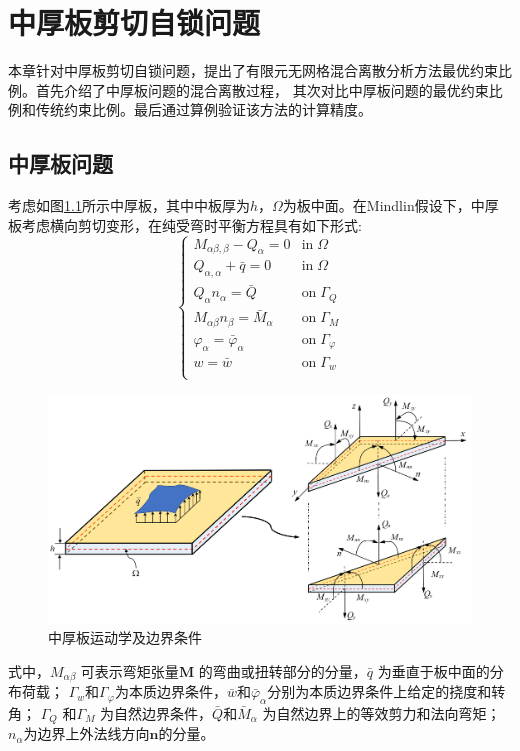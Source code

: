 \chapter{中厚板剪切自锁问题}
本章针对中厚板剪切自锁问题，提出了有限元无网格混合离散分析方法最优约束比例。首先介绍了中厚板问题的混合离散过程，
其次对比中厚板问题的最优约束比例和传统约束比例。最后通过算例验证该方法的计算精度。
\section{中厚板问题}                  
考虑如图\ref{Mindlinplate}所示中厚板，其中中板厚为$h$，$\Omega$为板中面。在Mindlin假设下，中厚板考虑横向剪切变形，在纯受弯时平衡方程具有如下形式:
\begin{equation}\label{z-1}
\begin{cases}
    M_{\alpha\beta,\beta} - Q_\alpha = 0 & \textrm{in}\; \Omega \\
    Q_{\alpha,\alpha} + \bar q = 0 & \textrm{in}\; \Omega \\    Q_\alpha n_\alpha = \bar Q & \textrm{on}\; \Gamma_Q \\
    M_{\alpha\beta} n_\beta = \bar M_\alpha & \textrm{on}\; \Gamma_M \\
    \varphi_\alpha = \bar \varphi_\alpha & \textrm{on}\; \Gamma_\varphi \\
    w = \bar w & \textrm{on}\; \Gamma_w \\
    \end{cases}
\end{equation}
\begin{figure}[H]
    \centering 
        \includegraphics[scale=0.5]{figures/shearlocking/Mindlinplate.png}
        \caption{中厚板运动学及边界条件}\label{Mindlinplate}
\end{figure}
式中，$M_{\alpha \beta}$ 可表示弯矩张量$\pmb{M}$ 的弯曲或扭转部分的分量，$\bar{q}$ 为垂直于板中面的分布荷载；
$\Gamma_w$和$\Gamma_\varphi$为本质边界条件，$\bar{w}$和$\bar{\varphi}_\alpha$分别为本质边界条件上给定的挠度和转角；
$\Gamma_Q$ 和$\Gamma_M$ 为自然边界条件，$\bar Q$和$\bar{M}_{\alpha}$ 为自然边界上的等效剪力和法向弯矩；
$n_\alpha$为边界上外法线方向$\pmb{n}$的分量。

